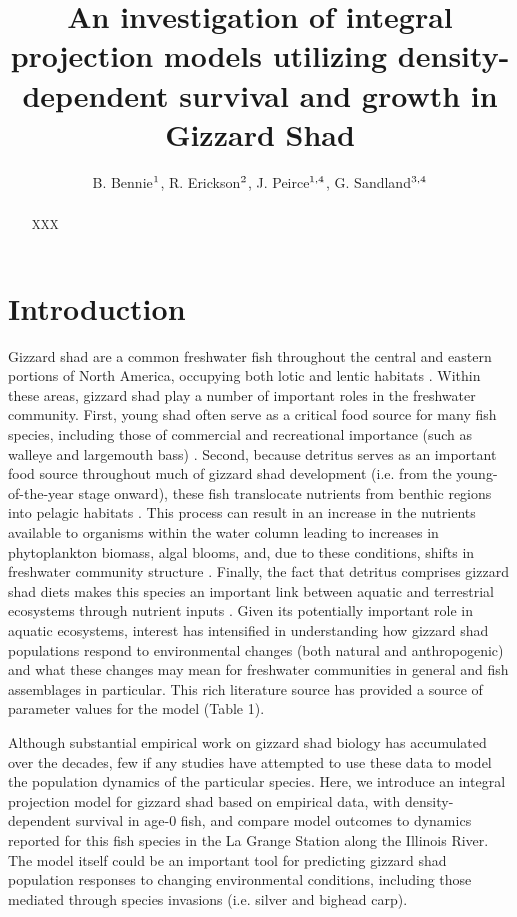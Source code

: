 \documentclass[11pt,oneside]{amsart}
\title[Gizzard Shad Model]{An investigation of integral projection models utilizing density-dependent survival and growth in Gizzard Shad}
\author{B. Bennie$^{\rm 1}$, R. Erickson$^{\rm 2}$, J. Peirce$^{\rm 1,4}$,  G.  Sandland$^{\rm 3,4}$}
\theoremstyle{definition}
\begin{document}
\maketitle

\begin{abstract}
XXX
\end{abstract}

\section{Introduction}
Gizzard shad are a common freshwater fish throughout the central and eastern portions of North America, occupying both lotic and lentic habitats \citep{pierce1981aspects,vanni2005linking}. Within these areas, gizzard shad play a number of important roles in the freshwater community. First, young shad often serve as a critical food source for many fish species, including those of commercial and recreational importance (such as walleye and largemouth bass) \citep{jester1972life}. Second, because detritus serves as an important food source throughout much of gizzard shad development (i.e. from the young-of-the-year stage onward), these fish translocate nutrients from benthic regions into pelagic habitats \citep{mather1995regeneration, schaus2000effects, vanni2005linking}. This process can result in an increase in the nutrients available to organisms within the water column leading to increases in phytoplankton biomass, algal blooms, and, due to these conditions, shifts in freshwater community structure \citep{aday2003direct, schaus2000effects}. Finally, the fact that detritus comprises gizzard shad diets makes this species an important link between aquatic and terrestrial ecosystems through nutrient inputs \citep{schaus2000effects}. Given its potentially important role in aquatic ecosystems, interest has intensified in understanding how gizzard shad populations respond to environmental changes (both natural and anthropogenic) and what these changes may mean for freshwater communities in general and fish assemblages in particular. This rich literature source has provided a source of parameter values for the model (Table 1).

Although substantial empirical work on gizzard shad biology has accumulated over the decades, few if any studies have attempted to use these data to model the population dynamics of the particular species. Here, we introduce an integral projection model for gizzard shad based on empirical data, with density-dependent survival in age-0 fish, and compare model outcomes to dynamics reported for this fish species in the La Grange Station along the Illinois River. The model itself could be an important tool for predicting gizzard shad population responses to changing environmental conditions, including those mediated through species invasions (i.e. silver and bighead carp).
\end{document}

